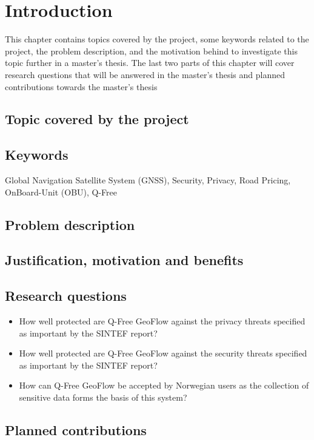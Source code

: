 \chapter{Introduction}
This chapter contains topics covered by the project, some keywords related to the project, the
problem description, and the motivation behind to investigate this topic further in a master's thesis.
The last two parts of this chapter will cover research questions that will be answered in the master's
thesis and planned contributions towards the master's thesis

\section{Topic covered by the project}

\section{Keywords}
Global Navigation Satellite System (GNSS), Security, Privacy, Road Pricing, OnBoard-Unit (OBU), Q-Free

\section{Problem description}

\section{Justification, motivation and benefits}

\section{Research questions}

\begin{itemize}
    \item How well protected are Q-Free GeoFlow against the privacy threats specified as important by the SINTEF report?
    \item How well protected are Q-Free GeoFlow against the security threats specified as important by the SINTEF report?
    \item How can Q-Free GeoFlow be accepted by Norwegian users as the collection of sensitive data forms the basis of this system? 
\end{itemize}

\section{Planned contributions}

